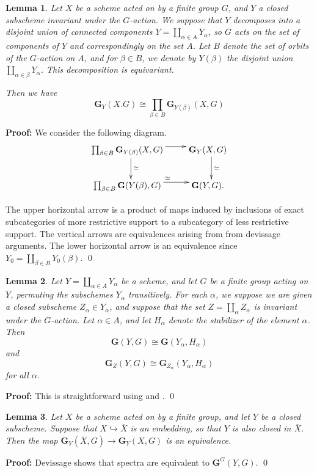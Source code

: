 \documentclass[11pt]{article}
\newcommand\mfk{\mathbf G}
\newtheorem{Lemma}{Lemma}[section]
\newenvironment{Proof}{\par\noindent\textbf{Proof:}}
{\qed}
\begin{document}
\begin{Lemma}\label{disjoint} Let $X$ be a scheme  acted on by a finite group $G$, and $Y$ a closed subscheme invariant under the $G$-action.  We suppose that $Y$ decomposes into a disjoint union of  connected components $Y = \coprod _{\alpha \in A} Y_{\alpha}$, so  $G$ acts on the set of components of $Y$ and correspondingly on the set $A$. Let $B$ denote the set of orbits of the $G$-action on $A$, and for $\beta \in B$, we denote by $Y(\beta)$ the disjoint union $\coprod _{\alpha \in \beta} Y_{\alpha}$. This decomposition is equivariant.    

Then we have 
$$  \mfk_{Y}(X. G) \cong  \prod_{\beta \in B} \mfk_{Y(\beta)}(X, G)
$$
    
\end{Lemma}
\begin{Proof}
We consider the following diagram. 
\begin{equation}
    \xymatrix{{\prod _{\beta \in B}\mfk _{Y(\beta)}(X, G)}  \ar@<1ex>[r] \ar@<1ex>[d]^{\simeq} &{\mfk_{Y}(X, G)} \ar@<1ex>[d]^{\simeq} \\
    {\prod _{\beta \in B}\mfk(Y(\beta), G)} \ar@<1ex>[r]^{\simeq} &   {\mfk(Y, G)} .}
\end{equation}


    The upper horizontal arrow is  a product of maps induced by inclusions of exact subcategories of more  restrictive support to a subcategory of less restrictive support.  
    The vertical arrows are equivalences arising from  from devissage arguments. The lower horizontal arrow is an equivalence since $Y_0 = \coprod _{\beta \in B} Y_0(\beta)$. 
\end{Proof}
\begin{Lemma} \label{disequivariant}
Let $Y = \coprod_{\alpha \in A} Y_{\alpha}$ be a scheme, and let $G$ be a finite group acting on $Y$, permuting the subschemes $Y_{\alpha}$ transitively.  For each $\alpha$, we suppose we are given a closed subscheme  $Z_{\alpha } \in Y_{\alpha}$, and suppose that the set $Z = \coprod _{\alpha}Z_{\alpha}$ is invariant under the $G$-action.  Let $\alpha \in A$, and let $H_{\alpha}$ denote the stabilizer of the element $\alpha$. Then 
$$\mfk(Y, G) \cong \mfk(Y_{\alpha}, H_{\alpha})
$$
and 
$$\mfk_{Z}(Y, G) \cong \mfk_{Z _{\alpha}}(Y_{\alpha}, H_{\alpha})
$$
for all $\alpha$. 
\end{Lemma}
\begin{Proof} This is straightforward using \cite{brion} and \cite{thomason}. 
\end{Proof} 
\begin{Lemma}\label{restriction}
    Let $X$ be a scheme acted on by a finite group, and let $Y$ be a closed subscheme.  Suppose that $X \hookrightarrow \overline{X}$ is an embedding, so that $Y$ is also closed in $\overline{X}$. Then the map $\mfk_Y(\overline{X},G) \rightarrow \mfk_Y(X,G)$ is an equivalence.  
\end{Lemma}
\begin{Proof}
    Devissage shows that spectra are equivalent to $\mfk^G(Y, G)$. 
\end{Proof}
\end{document}
